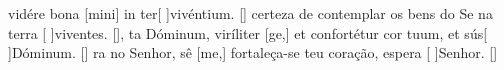 {  %
  { vidére bona [mini] in ter[ ]{vi}{vén}tium. [\LinkLA]}%
    { certeza de contemplar os bens do Se na terra [ ]{vi}{ven}tes. [\LinkPT]},
  {ta Dóminum, viríliter [ge,] et confortétur cor tu\-um, et sús[ ]{Dó}minum. [\LinkLA]}%
    {ra no Senhor, sê [me,] fortaleça-se teu coração, espera [ ]{Se}{nhor}. [\LinkPT]}
}